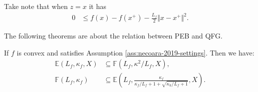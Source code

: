 \documentclass[12pt]{report}
\begin{document}
            Take note that when $z = x$ it has 
            \begin{align}\label{ineq:proj-grad2}
                0 &\le f(x) - f(x^+) - \frac{L_f}{2}\Vert x - x^+\Vert^2. 
            \end{align}
            \par
            The following theorems are about the relation between PEB and QFG.
            \begin{theorem}\label{thm:qfg-peb-equiv}
                If $f$ is convex and satisfies Assumption \ref{ass:necoara-2019-settings}. 
                Then we have: 
                \begin{align*}
                    \mathbb E(L_f, \kappa_f, X) &\subseteq \mathbb F(L_f, \kappa^2/L_f, X), 
                    \\
                    \mathbb F(L_f, \kappa_f) 
                    &\subseteq 
                    \mathbb E\left(
                        L_f,
                        \frac{\kappa_f}{\kappa_f/L_f + 1 + \sqrt{\kappa_k/L_f + 1}}, 
                        X
                    \right). 
                \end{align*}
            \end{theorem}
\end{document}
